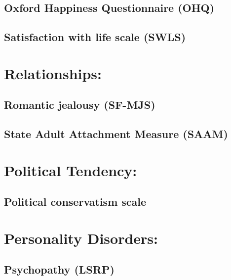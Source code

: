 \documentclass[
]{book}
\begin{document}
\hypertarget{oxford-happiness-questionnaire-ohq}{%
\subsection{Oxford Happiness Questionnaire (OHQ)}\label{oxford-happiness-questionnaire-ohq}}

\hypertarget{satisfaction-with-life-scale-swls}{%
\subsection{Satisfaction with life scale (SWLS)}\label{satisfaction-with-life-scale-swls}}

\hypertarget{relationships}{%
\section{Relationships:}\label{relationships}}

\hypertarget{romantic-jealousy-sf-mjs}{%
\subsection{Romantic jealousy (SF-MJS)}\label{romantic-jealousy-sf-mjs}}

\hypertarget{state-adult-attachment-measure-saam}{%
\subsection{State Adult Attachment Measure (SAAM)}\label{state-adult-attachment-measure-saam}}

\hypertarget{political-tendency}{%
\section{Political Tendency:}\label{political-tendency}}

\hypertarget{political-conservatism-scale}{%
\subsection{Political conservatism scale}\label{political-conservatism-scale}}

\hypertarget{personality-disorders}{%
\section{Personality Disorders:}\label{personality-disorders}}

\hypertarget{psychopathy-lsrp}{%
\subsection{Psychopathy (LSRP)}\label{psychopathy-lsrp}}
\end{document}
